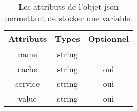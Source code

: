 \documentclass[a4paper,11pt]{report}
\begin{document}


\begin{table}[ht]
 \begin{tabular}{|c|c|c|}
   \hline
   Attributs & Types & Optionnel \\
   \hline
   name &  string & $-$\\
   \hline
   cache  & string & oui \\
    \hline
   service & string & oui \\
   \hline
   value & string  & oui  \\
    \hline
 \end{tabular}
 \caption{Les attributs de l'objet  json permettant de stocker une variable. \label{si:var} }
\end{table} 
\end{document}
